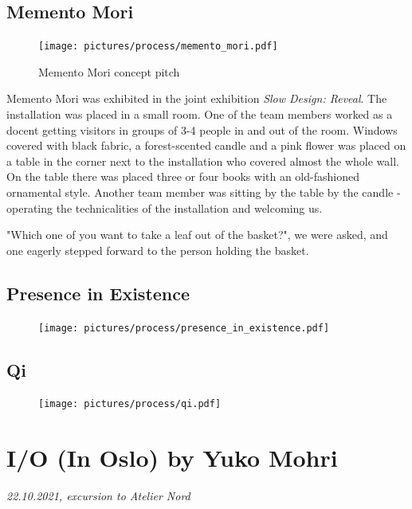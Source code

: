 \subsection{Memento Mori}

\begin{figure}[H]
\texttt{[image: pictures/process/memento\_mori.pdf]}
\caption{Memento Mori concept pitch}
\centering 
\end{figure}

Memento Mori was exhibited in the joint exhibition \emph{Slow Design: Reveal}. The installation was placed in a small room. One of the team members worked as a docent getting visitors in groups of 3-4 people in and out of the room. Windows covered with black fabric, a forest-scented candle and a pink flower was placed on a table in the corner next to the installation who covered almost the whole wall. On the table there was placed three or four books with an old-fashioned ornamental style. Another team member was sitting by the table by the candle - operating the technicalities of the installation and welcoming us.

"Which one of you want to take a leaf out of the basket?", we were asked, and one eagerly stepped forward to the person holding the basket. 




\subsection{Presence in Existence}

\begin{figure}[H]
\texttt{[image: pictures/process/presence\_in\_existence.pdf]}
\caption{}
\centering 
\end{figure}

\subsection{Qi}

\begin{figure}[H]
\texttt{[image: pictures/process/qi.pdf]}
\caption{}
\centering 
\end{figure}


\section{I/O (In Oslo) by Yuko Mohri}
\par
\emph{22.10.2021, excursion to Atelier Nord}
\par

